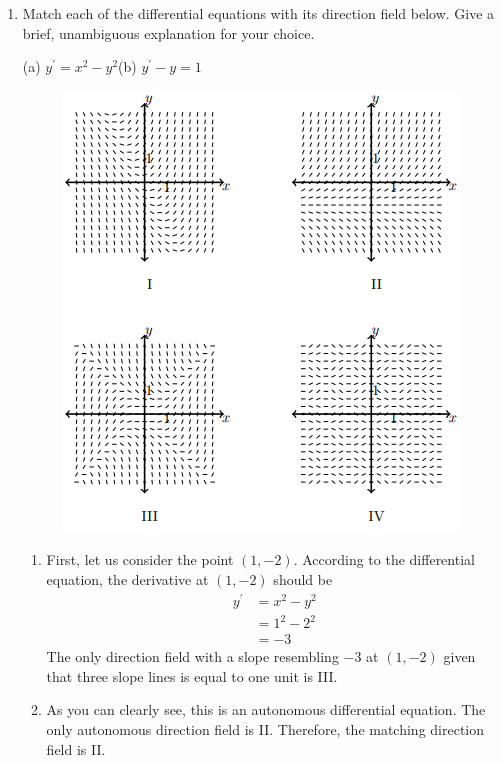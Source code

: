 \documentclass{article}
\begin{document}
\begin{enumerate}[label=\textbf{(1.\arabic*)}]

\item Match each of the differential equations with its direction field below. Give a brief, unambiguous explanation for your choice.
\begin{center}
(a) $y^\prime = x^2	-y^2$\qquad\qquad\qquad\qquad\qquad\qquad\qquad (b) $y^\prime - y = 1$
\begin{figure}[H]
\centering
\includegraphics[scale=0.75]{problem1}
\end{figure}
\end{center}

\begin{enumerate}
\item First, let us consider the point $(1,-2)$. According to the differential equation, the derivative at $(1,-2)$ should be
\begin{align*}
y^\prime &= x^2-y^2\\
&= 1^2-2^2\\
&= -3
\end{align*}
The only direction field with a slope resembling $-3$ at $(1,-2)$ given that three slope lines is equal to one unit is III.

\item As you can clearly see, this is an autonomous differential equation. The only autonomous direction field is II. Therefore, the matching direction field is II.
\end{enumerate}


\end{enumerate}
\end{document}
